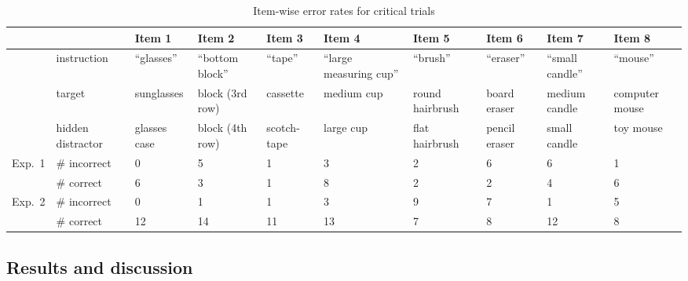 \documentclass[10pt,letterpaper]{article}
\begin{document}
\begin{table}
\begin{center}
\begin{tabular}{ m{.75cm} | m{1.5cm} | m{1.5cm} | m{1.5cm} |  m{1.25cm} | m{1.6cm} | m{1.4cm} | m{1.3cm} | m{1.3cm} | m{1.5cm} |}
& & Item 1 & Item 2 & Item 3 & Item 4 & Item 5 & Item 6 & Item 7 & Item 8\\\hline
& instruction & ``glasses'' & ``bottom block'' & ``tape'' & ``large measuring cup'' & ``brush'' & ``eraser'' & ``small candle'' & ``mouse'' \\\hline
& target & sunglasses & block (3rd row) & cassette & medium cup & round hairbrush & board eraser & medium candle & computer mouse \\\hline
& hidden distractor & glasses case & block (4th row) & scotch-tape & large cup & flat \,\,\,hairbrush & pencil eraser & small candle & toy mouse \\
 \hline\hline
\multirow{2}{.75cm}{Exp.~1}  & \# incorrect & 0 & 5 & 1 & 3 & 2 &6 & 6 & 1 \\ 
                                               & \# correct & 6 & 3 & 1 & 8 & 2 & 2 & 4 & 6 \\
 \hline\hline
\multirow{2}{.75cm}{Exp.~2} & \# incorrect & 0 & 1 & 1 & 3 & 9 & 7 & 1 & 5 \\
                                              & \# correct   & 12&14&11&13&7 &8   &12& 8 \\

\end{tabular}
\caption{Item-wise error rates for critical trials}
\label{table:ItemWise}
\end{center}
\end{table}


\subsection{Results and discussion}
\end{document}
